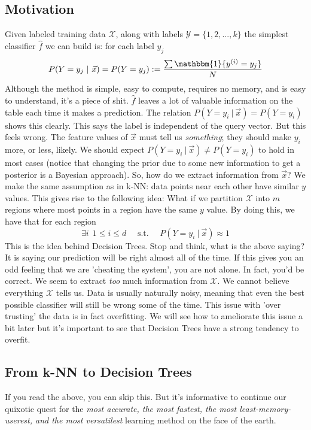 \documentclass[10pt]{article}
\begin{document}
	\subsection*{Motivation}
		Given labeled training data $\mathcal{X}$, along with labels $\mathcal{Y} = \{1, 2, ... , k\} $ 
		the simplest classifier $\hat f$ we can build is: for each label $y_j$  
		$$P(Y=y_j \ | \ \vec x) = P(Y=y_j) :=  \frac{ \sum\mathbbm{1} \{y^{(i)} = y_j \} }{N}  $$ 
		Although the method is simple, easy to compute, requires no memory, and is easy to understand, it's a piece of shit. 
		$\hat f$ leaves  a lot of valuable information on the table each time it makes a prediction. The relation 
		$P(Y=y_i \ | \ \vec x) = P(Y=y_i)$ shows this clearly. This says the label is independent of the query vector.
		But this feels wrong. The feature values of $\vec x$ must tell us \textit{something};
		they should make $y_i$ more, or less, likely. We should expect $P(Y=y_i \ | \ \vec x) \not = P(Y=y_i)$ to 
		hold in most cases (notice that changing the prior due to some new information to get a posterior is a
		Bayesian approach). So, how do we extract information from $\vec x$? We make the same assumption as in 
		k-NN: data points near each other have similar $y$ values. This gives rise to the following idea:
		What if we partition $\mathcal{X}$ into $m$ regions where most points in a region have the same $y$ value. 
		By doing this, we have that for each region
		$$\exists i \ \ 1 \leq i \leq d \quad \textrm{ s.t. } \quad P(Y = y_i \ | \ \vec x) \approx 1 $$ 
		This is the idea behind Decision Trees. Stop and think, what is the above saying? It is saying our prediction
		will be right almost all of the time. If this gives you an odd feeling that we are 'cheating the system', 
		you are not alone. In fact, you'd be correct. We seem to extract \textit{too} much information from 
		$\mathcal{X}$. We cannot believe everything $\mathcal X$ tells us. Data is usually naturally noisy, 
		meaning that even the best possible classifier will still be wrong some of the time. This issue with 
		'over trusting' the data is in fact overfitting. We will see how to ameliorate this issue a bit later but it's 
		important to see that Decision Trees have a strong tendency to overfit. 
		
	
	\subsection*{From k-NN to Decision Trees}
		If you read the above, you can skip this. But it's informative to continue our quixotic quest for the 
		\textit{most accurate, the most fastest, the most least-memory-userest, and the most versatilest} 
		learning method on the face of the earth. \\
		
\end{document}
